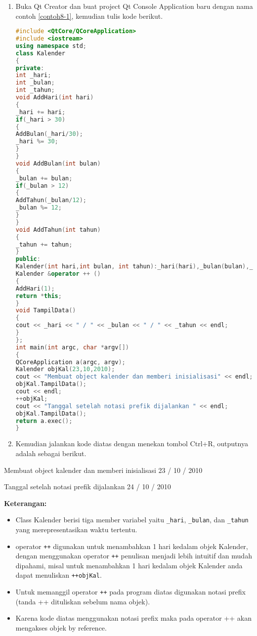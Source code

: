 \begin{enumerate}

\item
  Buka Qt Creator dan buat project Qt Console Application baru dengan
  nama contoh \ref{contoh8-1}, kemudian tulis kode berikut.

\begin{lstlisting}[language=c++, caption=Menggunakan Increment Operator (Notasi prefix), label=contoh8-1]
#include <QtCore/QCoreApplication>
#include <iostream>
using namespace std;
class Kalender
{
private:
int _hari;
int _bulan;
int _tahun;
void AddHari(int hari)
{
_hari += hari;
if(_hari > 30)
{
AddBulan(_hari/30);
_hari %= 30;
}
}
void AddBulan(int bulan)
{
_bulan += bulan;
if(_bulan > 12)
{
AddTahun(_bulan/12);
_bulan %= 12;
}
}
void AddTahun(int tahun)
{
_tahun += tahun;
}
public:
Kalender(int hari,int bulan, int tahun):_hari(hari),_bulan(bulan),_tahun(tahun){ }
Kalender &operator ++ ()
{
AddHari(1);
return *this;
}
void TampilData()
{
cout << _hari << " / " << _bulan << " / " << _tahun << endl;
}
};
int main(int argc, char *argv[])
{
QCoreApplication a(argc, argv);
Kalender objKal(23,10,2010);
cout << "Membuat object kalender dan memberi inisialisasi" << endl;
objKal.TampilData();
cout << endl;
++objKal;
cout << "Tanggal setelah notasi prefik dijalankan " << endl;
objKal.TampilData();
return a.exec();
}
\end{lstlisting}
\item
  Kemudian jalankan kode diatas dengan menekan tombol Ctrl+R, outputnya
  adalah sebagai berikut.
\end{enumerate}

\begin{lcverbatim}
Membuat object kalender dan memberi inisialisasi
23 / 10 / 2010

Tanggal setelah notasi prefik dijalankan
24 / 10 / 2010
\end{lcverbatim}

\textbf{Keterangan:}

\begin{itemize}

\item
  Class Kalender berisi tiga member variabel yaitu \texttt{\_hari},
  \texttt{\_bulan}, dan \texttt{\_tahun} yang merepresentasikan waktu
  tertentu.
\item
  operator \texttt{++} digunakan untuk menambahkan 1 hari kedalam objek
  Kalender, dengan menggunakan operator \texttt{++} penulisan menjadi
  lebih intuitif dan mudah dipahami, misal untuk menambahkan 1 hari
  kedalam objek Kalender anda dapat menuliskan \texttt{++objKal}.
\item
  Untuk memanggil operator \texttt{++} pada program diatas digunakan
  notasi prefix (tanda ++ dituliskan sebelum nama objek).
\item
  Karena kode diatas menggunakan notasi prefix maka pada operator ++
  akan mengakses objek by reference.
\end{itemize}

